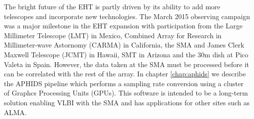 The bright future of the EHT is partly driven by its ability to add more telescopes and
incorporate new technologies.  The March 2015 observing campaign was a major milestone in
the EHT expansion with participation from the Large Millimeter Telescope (LMT) in Mexico, Combined Array for 
Research in Millimeter-wave Astornomy (CARMA) in California, the SMA and James Clerk Maxwell Telescope (JCMT) in
 Hawaii, SMT in Arizona and the 30m dish at Pico Valeta in Spain.  However, the data taken at the SMA must be 
processed before it
can be correlated with the rest of the array.  In chapter \ref{chap:aphids} we describe the APHIDS pipeline
which performs a sampling rate conversion using a cluster of Graphcs Processing Units (GPUs).  This software
is intended to be a long-term solution enabling VLBI with the SMA and has applications for other sites such 
as ALMA.
